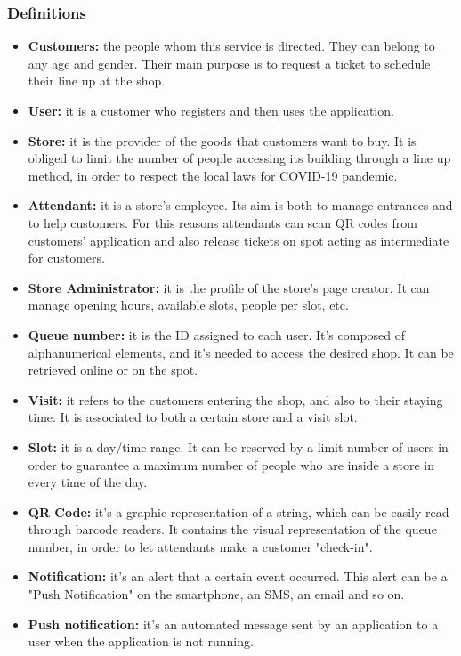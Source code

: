 \documentclass[table, 12pt]{article}
\begin{document}
\subsubsection{Definitions}
\begin{itemize}
    \item \textbf{Customers:} the people whom this service is directed. They can belong to any age and gender. Their main purpose is to request a ticket to schedule their line up at the shop.
    \item \textbf{User:} it is a customer who registers and then uses the application.\label{User}
    \item \textbf{Store:} it is the provider of the goods that customers want to buy. It is obliged to limit the number of people accessing its building through a line up method, in order to respect the local laws for COVID-19 pandemic.
    \item \textbf{Attendant:} it is a store's employee. Its aim is both to manage entrances and to help customers. For this reasons attendants can scan QR codes from customers' application and also release tickets on spot acting as intermediate for customers.
    \item \textbf{Store Administrator:} it is the profile of the store's page creator. It can manage opening hours, available slots, people per slot, etc.
    \item \textbf{Queue number:} it is the ID assigned to each user. It's composed of alphanumerical elements, and it's needed to access the desired shop. It can be retrieved online or on the spot.
    \item \textbf{Visit:} it refers to the customers entering the shop, and also to their staying time. It is associated to both a certain store and a visit slot.
    \item \textbf{Slot:} it is a day/time range. It can be reserved by a limit number of users in order to guarantee a maximum number of people who are inside a store in every time of the day.
    \item \textbf{QR Code:} it's a graphic representation of a string, which can be easily read through barcode readers. It contains the visual representation of the queue number, in order to let attendants make a customer "check-in".\label{QR}
    \item \textbf{Notification:} it's an alert that a certain event occurred. This alert can be a "Push Notification" on the smartphone, an SMS, an email and so on.
    \item \textbf{Push notification:} it's an automated message sent by an application to a user when the application is not running.

\end{itemize}
\end{document}
